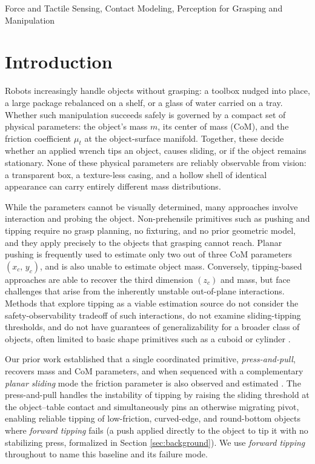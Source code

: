 \documentclass[10pt, conference]{IEEEtran}
\begin{document}
\begin{IEEEkeywords}
Force and Tactile Sensing, Contact Modeling, Perception for Grasping and Manipulation
\end{IEEEkeywords}

\IEEEpeerreviewmaketitle

\section{Introduction}

Robots increasingly handle objects without grasping: a toolbox nudged into place, a large package rebalanced on a shelf, or a glass of water carried on a tray. Whether such manipulation succeeds safely is governed by a compact set of physical parameters: the object's mass $m$, its center of mass (CoM), and the friction coefficient $\mu_t$ at the object-surface manifold. Together, these decide whether an applied wrench tips an object, causes sliding, or if the object remains stationary. None of these physical parameters are reliably observable from vision: a transparent box, a texture-less casing, and a hollow shell of identical appearance can carry entirely different mass distributions.

While the parameters cannot be visually determined, many approaches involve interaction and probing the object. Non-prehensile primitives such as pushing and tipping require no grasp planning, no fixturing, and no prior geometric model, and they apply precisely to the objects that grasping cannot reach. Planar pushing is frequently used \cite{mason_mechanics_1986, bauza_probabilistic_2017} to estimate only two out of three CoM parameters $(x_c,\,y_c)$, and is also unable to estimate object mass. Conversely, tipping-based approaches are able to recover the third dimension $(z_c)$ and mass, but face challenges that arise from the inherently unstable out-of-plane interactions. Methods that explore tipping as a viable estimation source do not consider the safety-observability tradeoff of such interactions, do not examine sliding-tipping thresholds, and do not have guarantees of generalizability for a broader class of objects, often limited to basic shape primitives such as a cuboid or cylinder \cite{yong_yu_estimation_1999, yong_yu_estimation_2001}. 

Our prior work established that a single coordinated primitive, \emph{press-and-pull}, recovers mass and CoM parameters, and when sequenced with a complementary \textit{planar sliding} mode the friction parameter is also observed and estimated \cite{hyland_isrr}. The press-and-pull handles the instability of tipping by raising the sliding threshold at the object--table contact and simultaneously pins an otherwise migrating pivot, enabling reliable tipping of low-friction, curved-edge, and round-bottom objects where \emph{forward tipping} fails (a push applied directly to the object to tip it with no stabilizing press, formalized in Section \ref{sec:background}). We use \emph{forward tipping} throughout to name this baseline and its failure mode.
\end{document}
